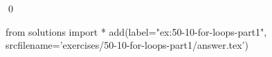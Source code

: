 
\begin{ex}
  \label{ex:50-10-for-loops-part1}
  
  \qed
\end{ex}
\begin{python0}
from solutions import *
add(label="ex:50-10-for-loops-part1",
    srcfilename='exercises/50-10-for-loops-part1/answer.tex')
\end{python0}
